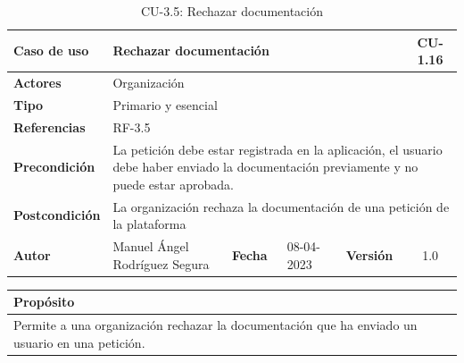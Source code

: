 \begin{table}[H]
    \begin{center}
        \begin{adjustbox}{width=\textwidth}
            \begin{tabular}{ | l | l | l | l | c | c | }
                \hline
                \textbf{Caso de uso} & \multicolumn{4}{l|}{Rechazar documentación} & \cellcolor{gray!50} \textbf{CU-1.16}\\
                \hline
                \textbf{Actores} & \multicolumn{5}{p{0.5\linewidth}|}{Organización} \\
                \hline
                \textbf{Tipo} & \multicolumn{5}{l|}{Primario y esencial} \\
                \hline
                \textbf{Referencias} & \multicolumn{3}{l|}{RF-3.5} & \multicolumn{2}{l|}{ }\\
                \hline
                \textbf{Precondición} & \multicolumn{5}{l|}{La petición debe estar registrada en la aplicación,
                el usuario debe haber enviado la documentación previamente y no puede estar aprobada.} \\
                \hline
                \textbf{Postcondición} & \multicolumn{5}{l|}{La organización rechaza la documentación de una petición de la plataforma} \\
                \hline
                \textbf{Autor} & \multicolumn{1}{p{0.25\linewidth}|}{Manuel Ángel Rodríguez Segura} & \textbf{Fecha} &
                08-04-2023     & \textbf{Versión}                                                      & 1.0\\
                \hline
            \end{tabular}
        \end{adjustbox}
        \caption{CU-3.5: Rechazar documentación}
        \label{tab:rechazar-documentacion}
    \end{center}
\end{table}

\begin{table}[H]
    \centering
    \begin{tabularx}{\textwidth}{@{} |L |@{}} \hline
        \textbf{Propósito} \\
        \hline
        Permite a una organización rechazar la documentación que ha enviado un usuario en una petición. \\
        \hline
    \end{tabularx}
\end{table}


